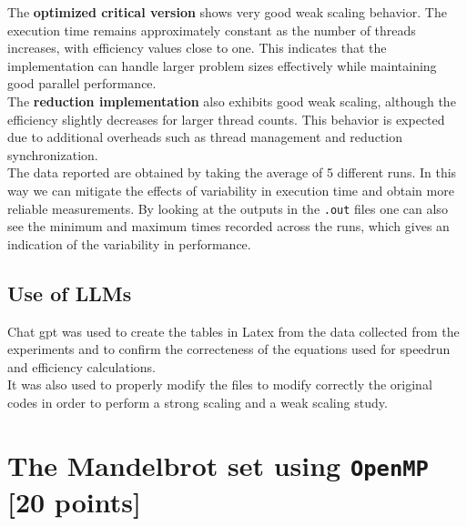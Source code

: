 \documentclass[unicode,10pt,a4paper,oneside,numbers=endperiod,openany]{scrartcl}
\begin{document}
The \textbf{optimized critical version} shows very good weak scaling behavior. The execution time remains approximately constant as the number of threads increases, with efficiency values close to one. This indicates that the implementation can handle larger problem sizes effectively while maintaining good parallel performance.\\

The \textbf{reduction implementation} also exhibits good weak scaling, although the efficiency slightly decreases for larger thread counts. This behavior is expected due to additional overheads such as thread management and reduction synchronization.\\

The data reported are obtained by taking the average of 5 different runs. In this way we can mitigate the effects of variability in execution time and obtain more reliable measurements. By looking at the outputs in the \texttt{.out} files one can also see the minimum and maximum times recorded across the runs, which gives an indication of the variability in performance.
\subsection{Use of LLMs}
Chat gpt was used to create the tables in Latex from the data collected from the experiments and to confirm the correcteness of the equations used for speedrun and efficiency calculations.\\
It was also used to properly modify the  files to modify correctly the original codes in order to perform a strong scaling and a weak scaling study.
\newpage
\section{The Mandelbrot set  using \texttt{OpenMP} [20 points]}
\end{document}
